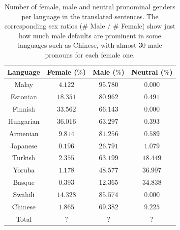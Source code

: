 \documentclass[fleqn,10pt]{article}
\begin{document}
\begin{table}[H]
\small{
	\centering
	\begin{tabular}{|c|c|c|c|}
	\hline
	Language 	& Female ($\%$) 	& Male ($\%$)		& Neutral ($\%$)	\\ \hline
	\hline
	Malay     	& $4.122$ 			& $95.780$  		& $0.000$			\\ \hline
	Estonian  	& $18.351$			& $80.962$  		& $0.491$			\\ \hline
	Finnish   	& $33.562$			& $66.143$  		& $0.000$			\\ \hline
	Hungarian 	& $36.016$			& $63.297$  		& $0.393$			\\ \hline
	Armenian  	& $9.814$			& $81.256$  		& $0.589$			\\ \hline
	Japanese  	& $0.196$			& $26.791$  		& $1.079$			\\ \hline
	Turkish   	& $2.355$			& $63.199$  		& $18.449$			\\ \hline
	Yoruba    	& $1.178$			& $48.577$  		& $36.997$			\\ \hline
	Basque    	& $0.393$			& $12.365$  		& $34.838$			\\ \hline
	Swahili   	& $14.328$ 			& $85.574$  		& $0.000$			\\ \hline
	Chinese   	& $1.865$ 			& $69.382$  		& $9.225$			\\ \hline \hline
	Total     	& ? 				& ? 				& ? 				\\ \hline
	\end{tabular}
	\caption{Number of female, male and neutral pronominal genders per language in the translated sentences. The corresponding sex ratios (\# Male / \# Female) show just how much male defaults are prominent in some languages such as Chinese, with almost 30 male pronouns for each female one.}
	\label{tab:gender-by-language}
	}
\end{table}
\end{document}
